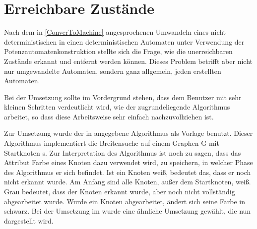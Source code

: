 \section{Erreichbare Zustände}\label{ReachableStates}

Nach dem in \ref{ConverToMachine} angesprochenen Umwandeln eines nicht
deterministischen in einen deterministischen Automaten unter Verwendung der
Potenzautomatenkonstruktion stellte sich die Frage, wie die unerreichbaren
Zustände erkannt und entfernt werden können. Dieses Problem betrifft aber nicht
nur umgewandelte Automaten, sondern ganz allgemein, jeden erstellten
Automaten.\vspace{10pt}

Bei der Umsetzung sollte im Vordergrund stehen, dass dem Benutzer mit sehr
kleinen Schritten verdeutlicht wird, wie der zugrundeliegende Algorithmus
arbeitet, so dass diese Arbeitsweise sehr einfach nachzuvollziehen
ist.\vspace{10pt}

Zur Umsetzung wurde der in \cite[S. 536]{Algorithmen} angegebene Algorithmus
als Vorlage benutzt. Dieser Algorithmus implementiert die Breitensuche auf
einem Graphen G mit Startknoten s. Zur Interpretation des Algorithmus ist noch
zu sagen, dass das Attribut Farbe eines Knoten dazu verwendet wird, zu
speichern, in welcher Phase des Algorithmus er sich befindet. Ist ein Knoten
weiß, bedeutet das, dass er noch nicht erkannt wurde. Am Anfang sind alle
Knoten, außer dem Startknoten, weiß. Grau bedeutet, dass der Knoten erkannt
wurde, aber noch nicht vollständig abgearbeitet wurde. Wurde ein Knoten
abgearbeitet, ändert sich seine Farbe in schwarz. Bei der Umsetzung im \gtitool
wurde eine ähnliche Umsetzung gewählt, die nun dargestellt wird.\vspace{10pt}

